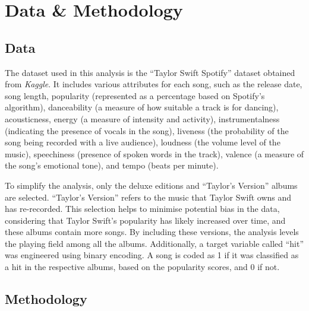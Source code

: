 \documentclass[11pt,preprint, authoryear]{elsarticle}
\numberwithin{equation}{section}
\numberwithin{figure}{section}
\numberwithin{table}{section}
\begin{document}
\hypertarget{data-methodology}{%
\section{\texorpdfstring{Data \& Methodology
\label{Data & Methodology}}{Data \& Methodology }}\label{data-methodology}}

\hypertarget{data}{%
\subsection*{Data}\label{data}}

The dataset used in this analysis is the ``Taylor Swift Spotify''
dataset obtained from \emph{Kaggle}. It includes various attributes for
each song, such as the release date, song length, popularity
(represented as a percentage based on Spotify's algorithm), danceability
(a measure of how suitable a track is for dancing), acousticness, energy
(a measure of intensity and activity), instrumentalness (indicating the
presence of vocals in the song), liveness (the probability of the song
being recorded with a live audience), loudness (the volume level of the
music), speechiness (presence of spoken words in the track), valence (a
measure of the song's emotional tone), and tempo (beats per minute).

To simplify the analysis, only the deluxe editions and ``Taylor's
Version'' albums are selected. ``Taylor's Version'' refers to the music
that Taylor Swift owns and has re-recorded. This selection helps to
minimise potential bias in the data, considering that Taylor Swift's
popularity has likely increased over time, and these albums contain more
songs. By including these versions, the analysis levels the playing
field among all the albums. Additionally, a target variable called
``hit'' was engineered using binary encoding. A song is coded as 1 if it
was classified as a hit in the respective albums, based on the
popularity scores, and 0 if not.

\hypertarget{methodology}{%
\subsection*{Methodology}\label{methodology}}
\end{document}
